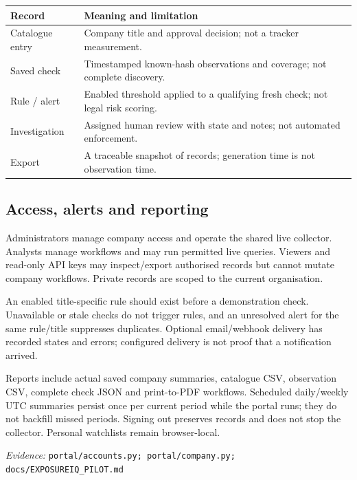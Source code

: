 \documentclass[11pt,a4paper]{article}
\newcommand{\code}[1]{{\small\nolinkurl{#1}}}
\newcommand{\source}[1]{{\footnotesize\textit{Evidence:} \code{#1}\par}}
\begin{document}
\begin{tabularx}{\linewidth}{@{}lY@{}}
\toprule
\textbf{Record} & \textbf{Meaning and limitation}\\
\midrule
Catalogue entry & Company title and approval decision; not a tracker measurement.\\
Saved check & Timestamped known-hash observations and coverage; not complete discovery.\\
Rule / alert & Enabled threshold applied to a qualifying fresh check; not legal risk scoring.\\
Investigation & Assigned human review with state and notes; not automated enforcement.\\
Export & A traceable snapshot of records; generation time is not observation time.\\
\bottomrule
\end{tabularx}

\subsection{Access, alerts and reporting}
Administrators manage company access and operate the shared live collector.
Analysts manage workflows and may run permitted live queries. Viewers and
read-only API keys may inspect/export authorised records but cannot mutate
company workflows. Private records are scoped to the current organisation.

An enabled title-specific rule should exist before a demonstration check.
Unavailable or stale checks do not trigger rules, and an unresolved alert
for the same rule/title suppresses duplicates. Optional email/webhook
delivery has recorded states and errors; configured delivery is not proof
that a notification arrived.

Reports include actual saved company summaries, catalogue CSV, observation
CSV, complete check JSON and print-to-PDF workflows. Scheduled daily/weekly
UTC summaries persist once per current period while the portal runs; they
do not backfill missed periods. Signing out preserves records and does not
stop the collector. Personal watchlists remain browser-local.

\source{portal/accounts.py; portal/company.py; docs/EXPOSUREIQ_PILOT.md}
\end{document}
